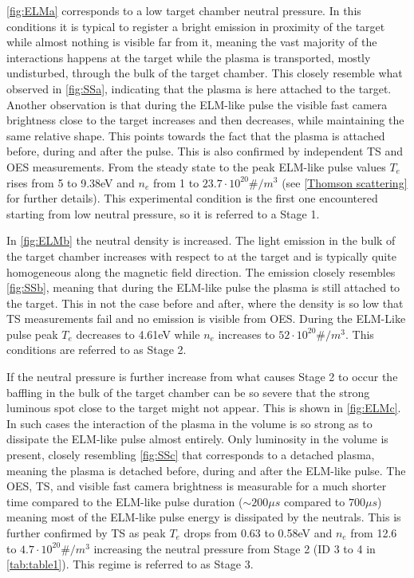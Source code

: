 \autoref{fig:ELMa} corresponds to a low target chamber neutral pressure. In this conditions it is typical to register a bright emission in proximity of the target while almost nothing is visible far from it, meaning the vast majority of the interactions happens at the target while the plasma is transported, mostly undisturbed, through the bulk of the target chamber. This closely resemble what observed in \autoref{fig:SSa}, indicating that the plasma is here attached to the target. Another observation is that during the ELM-like pulse the visible fast  camera brightness close to the target increases and then decreases, while maintaining the same relative shape. This points towards the fact that the plasma is attached before, during and after the pulse. This is also confirmed by independent TS and OES measurements. From the steady state to the peak ELM-like pulse values $T_e$ rises from 5 to 9.38eV and $n_e$ from 1 to $23.7 \cdot10^{20}\#/m^3$ (see \autoref{Thomson scattering} for further details). This experimental condition is the first one encountered starting from low neutral pressure, so it is referred to a Stage 1. 

In \autoref{fig:ELMb} the neutral density is increased. The light emission in the bulk of the target chamber increases with respect to at the target and is typically quite homogeneous along the magnetic field direction. The emission closely resembles \autoref{fig:SSb}, meaning that during the ELM-like pulse the plasma is still attached to the target. This in not the case before and after, where the density is so low that TS measurements fail and no emission is visible from OES. During the ELM-Like pulse peak $T_e$ decreases to 4.61eV while $n_e$ increases to $52 \cdot 10^{20}\#/m^3$. This conditions are referred to as Stage 2.

If the neutral pressure is further increase from what causes Stage 2 to occur the baffling in the bulk of the target chamber can be so severe that the strong luminous spot close to the target might not appear. This is shown in \autoref{fig:ELMc}. In such cases the interaction of the plasma in the volume is so strong as to dissipate the ELM-like pulse almost entirely. Only luminosity in the volume is present, closely resembling \autoref{fig:SSc} that corresponds to a detached plasma, meaning the plasma is detached before, during and after the ELM-like pulse. The OES, TS, and visible fast camera brightness is measurable for a much shorter time compared to the ELM-like pulse duration ($\sim 200 \mu s$ compared to $700 \mu s$) meaning most of the ELM-like pulse energy is dissipated by the neutrals. This is further confirmed by TS as peak $T_e$ drops from 0.63 to 0.58eV and $n_e$ from 12.6 to $4.7 \cdot10^{20}\#/m^3$ increasing the neutral pressure from Stage 2 (ID 3 to 4 in \autoref{tab:table1}). This regime is referred to as Stage 3.

